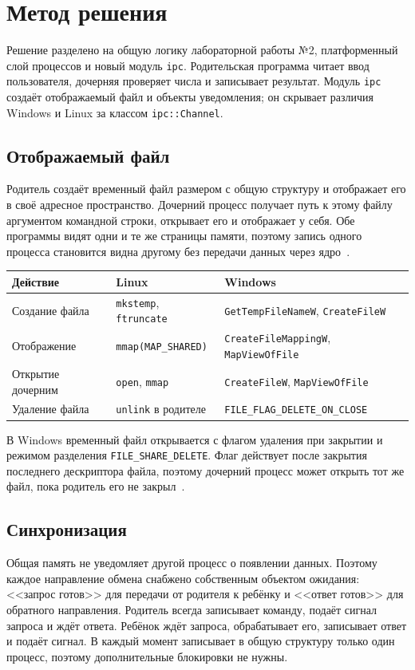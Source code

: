 \section{Метод решения}
Решение разделено на общую логику лабораторной работы №2, платформенный слой процессов и новый модуль \texttt{ipc}. Родительская программа читает ввод пользователя, дочерняя проверяет числа и записывает результат. Модуль \texttt{ipc} создаёт отображаемый файл и объекты уведомления; он скрывает различия Windows и Linux за классом \texttt{ipc::Channel}.

\subsection{Отображаемый файл}
Родитель создаёт временный файл размером с общую структуру и отображает его в своё адресное пространство. Дочерний процесс получает путь к этому файлу аргументом командной строки, открывает его и отображает у себя. Обе программы видят одни и те же страницы памяти, поэтому запись одного процесса становится видна другому без передачи данных через ядро~\cite{linuxmmap,winsharing,winmapping}.

\begin{center}
\begin{tabular}{lll}
Действие & Linux & Windows \\
\hline
Создание файла & \texttt{mkstemp}, \texttt{ftruncate} & \texttt{GetTempFileNameW}, \texttt{CreateFileW} \\
Отображение & \texttt{mmap(MAP\_SHARED)} & \texttt{CreateFileMappingW}, \texttt{MapViewOfFile} \\
Открытие дочерним & \texttt{open}, \texttt{mmap} & \texttt{CreateFileW}, \texttt{MapViewOfFile} \\
Удаление файла & \texttt{unlink} в родителе & \texttt{FILE\_FLAG\_DELETE\_ON\_CLOSE} \\
\end{tabular}
\end{center}

В Windows временный файл открывается с флагом удаления при закрытии и режимом разделения \texttt{FILE\_SHARE\_DELETE}. Флаг действует после закрытия последнего дескриптора файла, поэтому дочерний процесс может открыть тот же файл, пока родитель его не закрыл~\cite{deleteonclose}.

\subsection{Синхронизация}
Общая память не уведомляет другой процесс о появлении данных. Поэтому каждое направление обмена снабжено собственным объектом ожидания: <<запрос готов>> для передачи от родителя к ребёнку и <<ответ готов>> для обратного направления. Родитель всегда записывает команду, подаёт сигнал запроса и ждёт ответа. Ребёнок ждёт запроса, обрабатывает его, записывает ответ и подаёт сигнал. В каждый момент записывает в общую структуру только один процесс, поэтому дополнительные блокировки не нужны.

